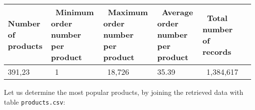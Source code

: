 \documentclass[11pt]{article}
\begin{document}
\begin{longtable}[]{@{}llllll@{}}
\toprule
\begin{minipage}[b]{0.02\columnwidth}\raggedright
Number of products\strut
\end{minipage} & \begin{minipage}[b]{0.02\columnwidth}\raggedright
~Minimum order number per product\strut
\end{minipage} & \begin{minipage}[b]{0.02\columnwidth}\raggedright
~Maximum order number per product\strut
\end{minipage} & \begin{minipage}[b]{0.02\columnwidth}\raggedright
~Average order number per product\strut
\end{minipage} & \begin{minipage}[b]{0.02\columnwidth}\raggedright
~Total number of records~\strut
\end{minipage} & \begin{minipage}[b]{0.02\columnwidth}\raggedright
\strut
\end{minipage}\tabularnewline
\midrule
\endhead
\begin{minipage}[t]{0.02\columnwidth}\raggedright
391,23\strut
\end{minipage} & \begin{minipage}[t]{0.02\columnwidth}\raggedright
~1\strut
\end{minipage} & \begin{minipage}[t]{0.02\columnwidth}\raggedright
~18,726\strut
\end{minipage} & \begin{minipage}[t]{0.02\columnwidth}\raggedright
35.39\strut
\end{minipage} & \begin{minipage}[t]{0.02\columnwidth}\raggedright
~1,384,617\strut
\end{minipage} & \begin{minipage}[t]{0.02\columnwidth}\raggedright
\strut
\end{minipage}\tabularnewline
\bottomrule
\end{longtable}

Let us determine the most popular products, by joining the retrieved
data with table \texttt{products.csv}:
\end{document}
